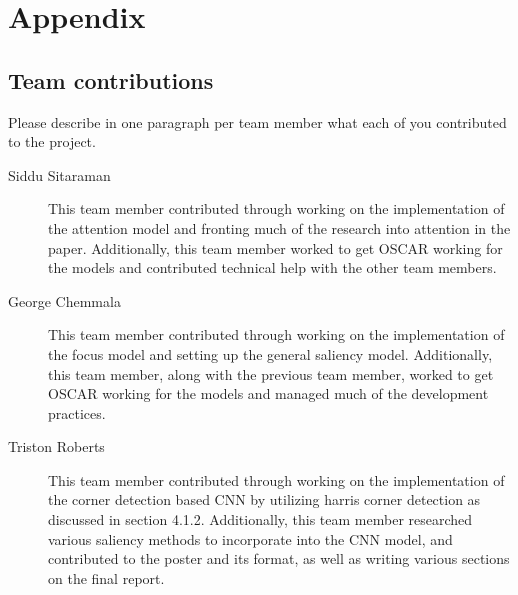 {\small


}

\section*{Appendix}

\subsection*{Team contributions}

Please describe in one paragraph per team member what each of you contributed to the project.
\begin{description}
\item[Siddu Sitaraman]
This team member contributed through working on the implementation of the attention model and fronting much of the research into attention in the paper. Additionally, this team member worked to get OSCAR working for the models and contributed technical help with the other team members.
\item[George Chemmala]
This team member contributed through working on the implementation of the focus model and setting up the general saliency model. Additionally, this team member, along with the previous team member, worked to get OSCAR working for the models and managed much of the development practices.
\item[Triston Roberts] 
This team member contributed through working on the implementation of the corner detection based CNN by utilizing harris corner detection as discussed in section 4.1.2. Additionally, this team member researched various saliency methods to incorporate into the CNN model, and contributed to the poster and its format, as well as writing various sections on the final report. 
\end{description}


